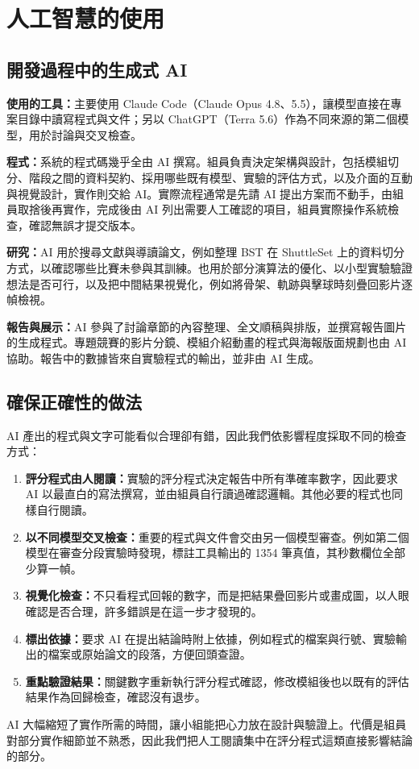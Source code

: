\chapter*{人工智慧的使用}
\label{app:ai-usage}

\section*{開發過程中的生成式 AI}

\textbf{使用的工具：}主要使用 Claude Code（Claude Opus 4.8、5.5），讓模型直接在專案目錄中讀寫程式與文件；另以 ChatGPT（Terra 5.6）作為不同來源的第二個模型，用於討論與交叉檢查。

\textbf{程式：}系統的程式碼幾乎全由 AI 撰寫。組員負責決定架構與設計，包括模組切分、階段之間的資料契約、採用哪些既有模型、實驗的評估方式，以及介面的互動與視覺設計，實作則交給 AI。實際流程通常是先請 AI 提出方案而不動手，由組員取捨後再實作，完成後由 AI 列出需要人工確認的項目，組員實際操作系統檢查，確認無誤才提交版本。

\textbf{研究：}AI 用於搜尋文獻與導讀論文，例如整理 BST 在 ShuttleSet 上的資料切分方式，以確認哪些比賽未參與其訓練。也用於部分演算法的優化、以小型實驗驗證想法是否可行，以及把中間結果視覺化，例如將骨架、軌跡與擊球時刻疊回影片逐幀檢視。

\textbf{報告與展示：}AI 參與了討論章節的內容整理、全文順稿與排版，並撰寫報告圖片的生成程式。專題競賽的影片分鏡、模組介紹動畫的程式與海報版面規劃也由 AI 協助。報告中的數據皆來自實驗程式的輸出，並非由 AI 生成。

\section*{確保正確性的做法}

AI 產出的程式與文字可能看似合理卻有錯，因此我們依影響程度採取不同的檢查方式：

\begin{enumerate}
  \item \textbf{評分程式由人閱讀：}實驗的評分程式決定報告中所有準確率數字，因此要求 AI 以最直白的寫法撰寫，並由組員自行讀過確認邏輯。其他必要的程式也同樣自行閱讀。
  \item \textbf{以不同模型交叉檢查：}重要的程式與文件會交由另一個模型審查。例如第二個模型在審查分段實驗時發現，標註工具輸出的 1354 筆真值，其秒數欄位全部少算一幀。
  \item \textbf{視覺化檢查：}不只看程式回報的數字，而是把結果疊回影片或畫成圖，以人眼確認是否合理，許多錯誤是在這一步才發現的。
  \item \textbf{標出依據：}要求 AI 在提出結論時附上依據，例如程式的檔案與行號、實驗輸出的檔案或原始論文的段落，方便回頭查證。
  \item \textbf{重點驗證結果：}關鍵數字重新執行評分程式確認，修改模組後也以既有的評估結果作為回歸檢查，確認沒有退步。
\end{enumerate}

AI 大幅縮短了實作所需的時間，讓小組能把心力放在設計與驗證上。代價是組員對部分實作細節並不熟悉，因此我們把人工閱讀集中在評分程式這類直接影響結論的部分。
